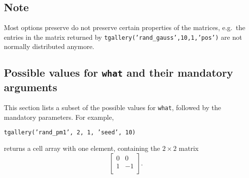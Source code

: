 \subsection*{Note}
Most options preserve do not preserve certain properties of the matrices, e.g.\ the entries in the matrix returned by
\texttt{tgallery('rand\_gauss',10,1,'pos')} are not normally distributed anymore.

\subsection{Possible values for \texttt{what} and their mandatory arguments}
This section lists a subset of the possible values for \texttt{what}, followed by the mandatory parameters. For example,
\begin{center}
\texttt{tgallery('rand\_pm1', 2, 1, 'seed', 10)}
\end{center}
 returns a cell array with one element, containing the $2\times2$ matrix
 \begin{equation*}
\left[\begin{array}{rr}
0& 0\\
1& -1\\
\end{array}\right].
 \end{equation*}
